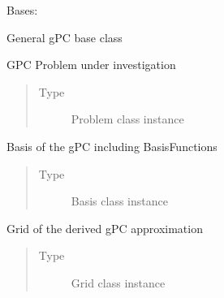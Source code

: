 \documentclass[letterpaper,10pt,english,openany,oneside]{sphinxmanual}
\begin{document}
\begin{fulllineitems}
\label{\detokenize{pygpc:pygpc.GPC.GPC}}
Bases: 

General gPC base class

\begin{fulllineitems}
\label{\detokenize{pygpc:pygpc.GPC.GPC.problem}}
GPC Problem under investigation
\begin{quote}\begin{description}
\item[{Type}] \leavevmode
Problem class instance

\end{description}\end{quote}

\end{fulllineitems}


\begin{fulllineitems}
\label{\detokenize{pygpc:pygpc.GPC.GPC.basis}}
Basis of the gPC including BasisFunctions
\begin{quote}\begin{description}
\item[{Type}] \leavevmode
Basis class instance

\end{description}\end{quote}

\end{fulllineitems}


\begin{fulllineitems}
\label{\detokenize{pygpc:pygpc.GPC.GPC.grid}}
Grid of the derived gPC approximation
\begin{quote}\begin{description}
\item[{Type}] \leavevmode
Grid class instance

\end{description}\end{quote}


\end{fulllineitems}
\end{fulllineitems}
\end{document}
